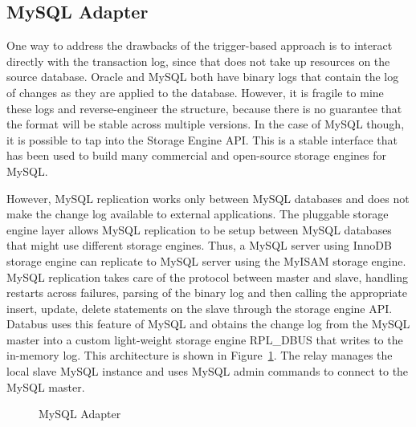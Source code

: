 \subsection{MySQL Adapter}
One way to address the drawbacks of the trigger-based approach is to interact directly with the transaction log, since that does not take up resources on the source database.
Oracle and MySQL both have binary logs that contain the log of changes as they are applied to the database. However, it is fragile to mine these logs and reverse-engineer the structure, because there is no guarantee that the format will be stable across multiple versions. In the case of MySQL though, it is possible to tap into the Storage Engine API. This is a stable interface that has been used to build many commercial and open-source storage engines for MySQL.


However, MySQL replication works only between MySQL databases and does not make the change log available to external applications. The pluggable storage engine layer allows MySQL replication to be setup between MySQL databases that might use different storage engines. 
Thus, a MySQL server using InnoDB storage engine can replicate to MySQL server using the MyISAM storage engine. MySQL replication takes care of the protocol between master and slave, handling restarts across failures, parsing of the binary log and then calling the appropriate insert, update, delete statements on the slave through the storage engine API. Databus uses this feature of MySQL and obtains the change log from the MySQL master into a custom light-weight storage engine RPL\_DBUS that writes to the in-memory log. This architecture is shown in Figure~\ref{fig:mysql-adapter}. The relay manages the local slave MySQL instance and uses MySQL admin commands to connect to the MySQL master.

\begin{figure}
\centering
{}
\caption{MySQL Adapter}
\label{fig:mysql-adapter}
\end{figure}
